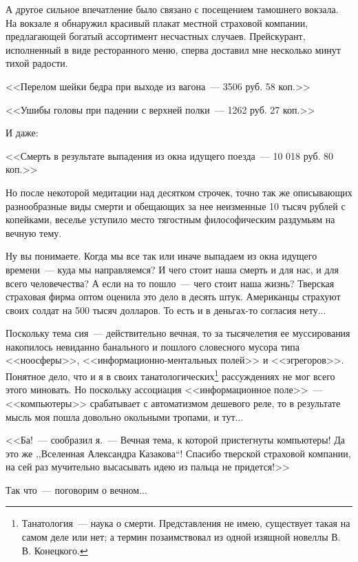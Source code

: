 \documentclass{scrbook}
\newcommand{\isAFourOneside}{\boolexpr{\value{bookformat} = \value{bfAFourOneside}}}
\newcommand{\isAFourTwoside}{\boolexpr{\value{bookformat} = \value{bfAFourTwoside}}}
\newcommand{\isAFour}{\boolexpr{\isAFourOneside \OR \isAFourTwoside}}
\newcommand{\glqq}{,,}
\newcommand{\grqq}{``}
\newcommand{\flqq}{<<}
\newcommand{\frqq}{>>}
\newcommand{\mdash}{~--- }
\begin{document}
А другое сильное впечатление было связано с посещением тамошнего вокзала. На вокзале я обнаружил красивый плакат местной страховой компании, предлагающей богатый ассортимент несчастных случаев. Прейскурант, исполненный в виде ресторанного меню, сперва доставил мне несколько минут тихой радости.

{\flqq}Перелом шейки бедра при выходе из вагона{\mdash}3506 руб. 58 коп.{\frqq}

{\flqq}Ушибы головы при падении с верхней полки{\mdash}1262 руб. 27 коп.{\frqq}

И даже:

{\flqq}Смерть в результате выпадения из окна идущего поезда{\mdash}10 018 руб. 80 коп.{\frqq}

Но после некоторой медитации над десятком строчек, точно так же описывающих разнообразные виды смерти и обещающих за нее неизменные 10 тысяч рублей с копейками, веселье уступило место тягостным философическим раздумьям на вечную тему.

Ну вы понимаете. Когда мы все так или иначе выпадаем из окна идущего времени{\mdash}куда мы направляемся? И чего стоит наша смерть и для нас, и для всего человечества? А если на то пошло{\mdash}чего стоит наша жизнь? Тверская страховая фирма оптом оценила это дело в десять штук. Американцы страхуют своих солдат на 500 тысяч долларов. То есть и в деньгах-то согласия нету...

Поскольку тема сия{\mdash}действительно вечная, то за тысячелетия ее муссирования накопилось невиданно банального и пошлого словесного мусора типа {\flqq}ноосферы{\frqq}, {\flqq}информационно-ментальных полей{\frqq} и {\flqq}эгрегоров{\frqq}. Понятное дело, что и я в своих танатологических\footnote{Танатология{\mdash}наука о смерти. Представления не имею, существует такая на самом деле или нет; а термин позаимствовал из одной изящной новеллы В. В. Конецкого.} рассуждениях не мог всего этого миновать. Но поскольку ассоциация {\flqq}информационное поле{\frqq}{\mdash}{\flqq}компьютеры{\frqq} срабатывает с автоматизмом дешевого реле, то в результате мысль моя пошла довольно окольными тропами, и тут...

{\flqq}Ба!{\mdash}сообразил я.{\mdash}Вечная тема, к которой пристегнуты компьютеры! Да это же {\glqq}Вселенная Александра Казакова{\grqq}! Спасибо тверской страховой компании, на сей раз мучительно высасывать идею из пальца не придется!{\frqq}

Так что{\mdash}поговорим о вечном...

\ifcase\isAFour
	\pagebreak
\fi
\end{document}
